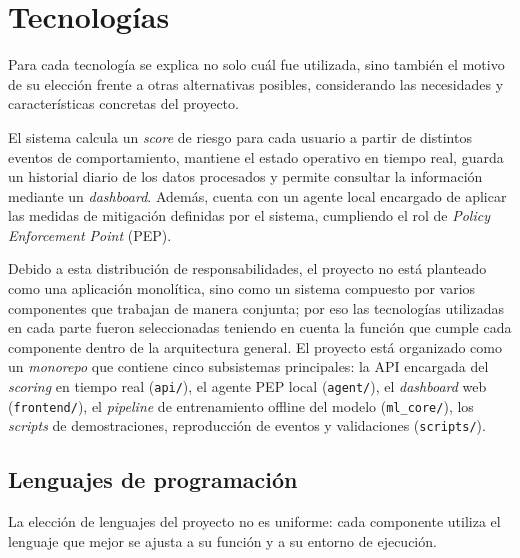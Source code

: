 \chapter{Tecnologías}
\label{sec:tecnologias}
Para cada tecnología se explica no solo cuál fue utilizada, sino también el motivo de su elección frente a otras alternativas posibles, considerando las necesidades y características concretas del proyecto.

El sistema calcula un \emph{score} de riesgo para cada usuario a partir de distintos eventos de comportamiento, mantiene el estado operativo en tiempo real, guarda un historial diario de los datos procesados y permite consultar la información mediante un \emph{dashboard}. Además, cuenta con un agente local encargado de aplicar las medidas de mitigación definidas por el sistema, cumpliendo el rol de \emph{Policy Enforcement Point} (PEP).

Debido a esta distribución de responsabilidades, el proyecto no está planteado como una aplicación monolítica, sino como un sistema compuesto por varios componentes que trabajan de manera conjunta; por eso las tecnologías utilizadas en cada parte fueron seleccionadas teniendo en cuenta la función que cumple cada componente dentro de la arquitectura general. El proyecto está organizado como un \emph{monorepo} que contiene cinco subsistemas principales: la API encargada del \emph{scoring} en tiempo real (\texttt{api/}), el agente PEP local (\texttt{agent/}), el \emph{dashboard} web (\texttt{frontend/}), el \emph{pipeline} de entrenamiento offline del modelo (\texttt{ml\_core/}), los \emph{scripts} de demostraciones, reproducción de eventos y validaciones (\texttt{scripts/}).

\section{Lenguajes de programación}
La elección de lenguajes del proyecto no es uniforme: cada componente utiliza el lenguaje que mejor se ajusta a su función y a su entorno de ejecución.

